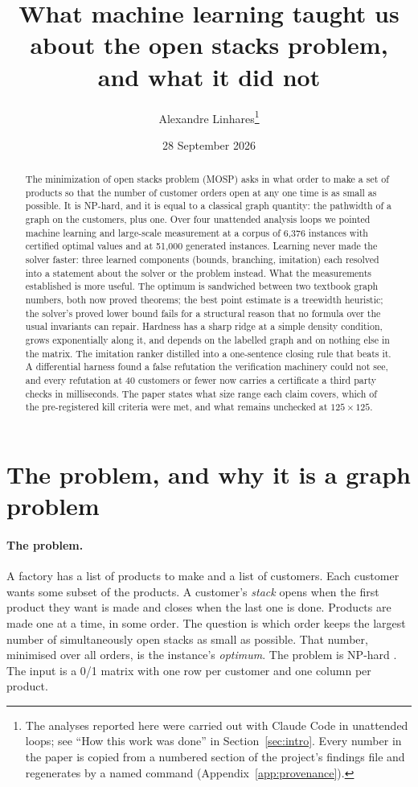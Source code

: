 \documentclass[11pt,a4paper]{article}
\title{What machine learning taught us about the open stacks problem,\\ and what it did not}
\author{Alexandre Linhares\thanks{The analyses reported here were carried out
with Claude Code in unattended loops; see ``How this work was done'' in
Section~\ref{sec:intro}. Every number in the paper is copied from a numbered
section of the project's findings file and regenerates by a named command
(Appendix~\ref{app:provenance}).}}
\date{28 September 2026}
\begin{document}
\maketitle

\begin{abstract}
The minimization of open stacks problem (MOSP) asks in what order to make a
set of products so that the number of customer orders open at any one time is
as small as possible. It is NP-hard, and it is equal to a classical graph
quantity: the pathwidth of a graph on the customers, plus one. Over four
unattended analysis loops we pointed machine learning and large-scale
measurement at a corpus of 6,376 instances with certified optimal values and
at 51,000 generated instances. Learning never made the solver faster: three
learned components (bounds, branching, imitation) each resolved into a
statement about the solver or the problem instead. What the measurements
established is more useful. The optimum is sandwiched between two textbook
graph numbers, both now proved theorems; the best point estimate is a
treewidth heuristic; the solver's proved lower bound fails for a structural
reason that no formula over the usual invariants can repair. Hardness has a
sharp ridge at a simple density condition, grows exponentially along it, and
depends on the labelled graph and on nothing else in the matrix. The
imitation ranker distilled into a one-sentence closing rule that beats it.
A differential harness found a false refutation the verification machinery
could not see, and every refutation at 40 customers or fewer now carries a
certificate a third party checks in milliseconds. The paper states what size
range each claim covers, which of the pre-registered kill criteria were met,
and what remains unchecked at $125 \times 125$.
\end{abstract}

\section{The problem, and why it is a graph problem}
\label{sec:intro}

\paragraph{The problem.}
A factory has a list of products to make and a list of customers. Each
customer wants some subset of the products. A customer's \emph{stack} opens
when the first product they want is made and closes when the last one is
done. Products are made one at a time, in some order. The question is which
order keeps the largest number of simultaneously open stacks as small as
possible. That number, minimised over all orders, is the instance's
\emph{optimum}. The problem is NP-hard \citep{LY2002}. The input is a 0/1
matrix with one row per customer and one column per product.
\end{document}

